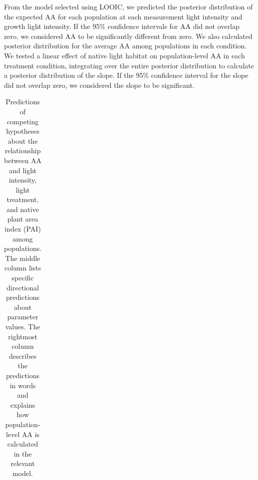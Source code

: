 \documentclass[
  letterpaper,
  DIV=11,
  numbers=noendperiod]{scrartcl}
\newcommand{\aax}{$\mathrm{AA}$}
\begin{document}
From the model selected using LOOIC, we predicted the posterior
distribution of the expected \aax{} for each population at each
measurement light intensity and growth light intensity. If the 95\%
confidence intervals for \aax{} did not overlap zero, we considered
\aax{} to be significantly different from zero. We also calculated
posterior distribution for the average \aax{} among populations in each
condition. We tested a linear effect of native light habitat on
population-level \aax{} in each treatment condition, integrating over
the entire posterior distribution to calculate a posterior distribution
of the slope. If the 95\% confidence interval for the slope did not
overlap zero, we considered the slope to be significant.

\begin{longtable}{>{\raggedright\arraybackslash}p{1in}>{\raggedright\arraybackslash}p{1.5in}>{\raggedright\arraybackslash}p{3in}}

\caption{\label{tbl-predictions}Predictions of competing hypotheses
about the relationship between \aax{} and light intensity, light
treatment, and native plant area index (PAI) among populations. The
middle column lists specific directional predictions about parameter
values. The rightmost column describes the predictions in words and
explains how population-level \aax{} is calculated in the relevant
model.}

\tabularnewline


\end{longtable}
\end{document}
